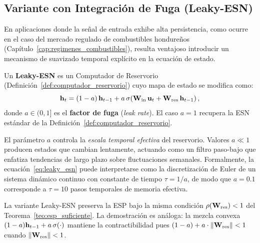 \subsection{Variante con Integración de Fuga (Leaky-ESN)}
\label{subsec:leaky_esn}

En aplicaciones donde la señal de entrada exhibe alta persistencia,
como ocurre en el caso del mercado regulado de combustibles hondureños
(Capítulo~\ref{cap:regimenes_combustibles}), resulta ventajoso
introducir un mecanismo de suavizado temporal explícito en la
ecuación de estado.

\begin{definition}
\label{def:leaky_esn}
Un \textbf{Leaky-ESN} \cite{jaeger2001echo} es un Computador de
Reservorio (Definición~\ref{def:computador_reservorio}) cuyo mapa
de estado se modifica como:
\begin{equation}
    \mathbf{h}_t = (1 - a)\,\mathbf{h}_{t-1} + a\,\sigma\!\left(
    \mathbf{W}_{\text{in}}\,\mathbf{u}_t +
    \mathbf{W}_{\text{res}}\,\mathbf{h}_{t-1}\right),
    \label{eq:leaky_esn}
\end{equation}
donde $a \in (0, 1]$ es el \textbf{factor de fuga}
(\textit{leak rate}).  El caso $a = 1$ recupera la ESN estándar
de la Definición~\ref{def:computador_reservorio}.
\end{definition}

El parámetro $a$ controla la \emph{escala temporal efectiva} del
reservorio.  Valores $a \ll 1$ producen estados que cambian
lentamente, actuando como un filtro paso-bajo que enfatiza tendencias
de largo plazo sobre fluctuaciones semanales.  Formalmente, la
ecuación~\eqref{eq:leaky_esn} puede interpretarse como la
discretización de Euler de un sistema dinámico continuo con constante
de tiempo $\tau = 1/a$, de modo que $a = 0.1$ corresponde a
$\tau = 10$ pasos temporales de memoria efectiva.

\begin{remark}
\label{obs:esp_leaky}
La variante Leaky-ESN preserva la ESP bajo la misma condición
$\rho(\mathbf{W}_{\text{res}}) < 1$ del Teorema~\ref{teo:esp_suficiente}.
La demostración es análoga: la mezcla convexa
$(1-a)\mathbf{h}_{t-1} + a\,\sigma(\cdot)$ mantiene la contractibilidad
pues $(1-a) + a \cdot \|\mathbf{W}_{\text{res}}\| < 1$ cuando
$\|\mathbf{W}_{\text{res}}\| < 1$.
\end{remark}

